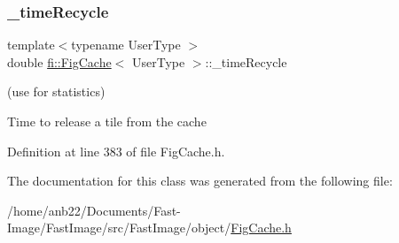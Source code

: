 \subsubsection{\texorpdfstring{\+\_\+time\+Recycle}{\_timeRecycle}}
{\footnotesize\ttfamily template$<$typename User\+Type $>$ \\
double \hyperlink{classfi_1_1FigCache}{fi\+::\+Fig\+Cache}$<$ User\+Type $>$\+::\+\_\+time\+Recycle\hspace{0.3cm}{\ttfamily [private]}}



(use for statistics) 

Time to release a tile from the cache 

Definition at line 383 of file Fig\+Cache.\+h.



The documentation for this class was generated from the following file\+:\begin{DoxyCompactItemize}
\item 
/home/anb22/\+Documents/\+Fast-\/\+Image/\+Fast\+Image/src/\+Fast\+Image/object/\hyperlink{FigCache_8h}{Fig\+Cache.\+h}\end{DoxyCompactItemize}
